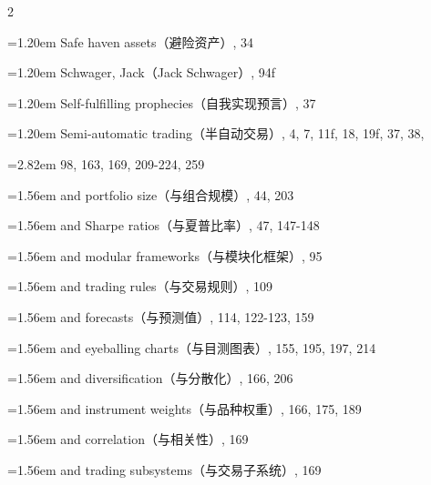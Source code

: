 {\begin{multicols}{2}
\par \noindent\hangindent=1.20em\hspace*{0.00em} Safe haven assets（避险资产）, 34
\par \noindent\hangindent=1.20em\hspace*{0.00em} Schwager, Jack（Jack Schwager）, 94f
\par \noindent\hangindent=1.20em\hspace*{0.00em} Self-fulfilling prophecies（自我实现预言）, 37
\par \noindent\hangindent=1.20em\hspace*{0.00em} Semi-automatic trading（半自动交易）, 4, 7, 11f, 18, 19f, 37, 38,
\par \noindent\hangindent=2.82em\hspace*{1.62em} 98, 163, 169, 209-224, 259
\par \noindent\hangindent=1.56em\hspace*{0.36em} and portfolio size（与组合规模）, 44, 203
\par \noindent\hangindent=1.56em\hspace*{0.36em} and Sharpe ratios（与夏普比率）, 47, 147-148
\par \noindent\hangindent=1.56em\hspace*{0.36em} and modular frameworks（与模块化框架）, 95
\par \noindent\hangindent=1.56em\hspace*{0.36em} and trading rules（与交易规则）, 109
\par \noindent\hangindent=1.56em\hspace*{0.36em} and forecasts（与预测值）, 114, 122-123, 159
\par \noindent\hangindent=1.56em\hspace*{0.36em} and eyeballing charts（与目测图表）, 155, 195, 197, 214
\par \noindent\hangindent=1.56em\hspace*{0.36em} and diversification（与分散化）, 166, 206
\par \noindent\hangindent=1.56em\hspace*{0.36em} and instrument weights（与品种权重）, 166, 175, 189
\par \noindent\hangindent=1.56em\hspace*{0.36em} and correlation（与相关性）, 169
\par \noindent\hangindent=1.56em\hspace*{0.36em} and trading subsystems（与交易子系统）, 169

\end{multicols}}
